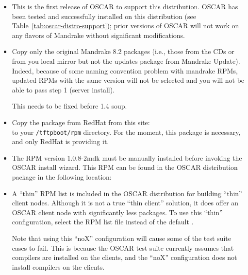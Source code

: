 \begin{itemize}
\item This is the first release of OSCAR to support this distribution.
  OSCAR \oscarversion\- has been tested and successfully installed on
  this distribution (see Table~\ref{tab:oscar-distro-support}); prior
  versions of OSCAR will not work on any flavors of Mandrake without
  significant modifications.
  
\item Copy only the original Mandrake 8.2 packages (i.e., those from
  the CDs or from you local mirror but not the updates package from
  Mandrake Update).  Indeed, because of some naming convention problem
  with mandrake RPMs, updated RPMs with the same version will not be
  selected and you will not be able to pass step 1 (server install).
  
  \begin{discuss}
    This needs to be fixed before 1.4 soup.
  \end{discuss}
  
\item Copy the  package from RedHat from this site: \\
  to your {\tt /tftpboot/rpm} directory. For the moment, this package
  is necessary, and only RedHat is providing it.

\item The  RPM version 1.0.8-2mdk must be manually
  installed before invoking the OSCAR install wizard.  This RPM can be
  found in the OSCAR distribution package in the following location:\\
  
\item A ``thin'' RPM list is included in the OSCAR distribution for
  building ``thin'' client nodes.  Although it is not a true ``thin
  client'' solution, it does offer an OSCAR client node with
  significantly less packages.  To use this ``thin'' configuration,
  select the RPM list file
   instead of the
  default .
  
  Note that using this ``noX'' configuration will cause some of the
  test suite cases to fail.  This is because the OSCAR test suite
  currently assumes that compilers are installed on the clients, and
  the ``noX'' configuration does not install compilers on the clients.


\end{itemize}
